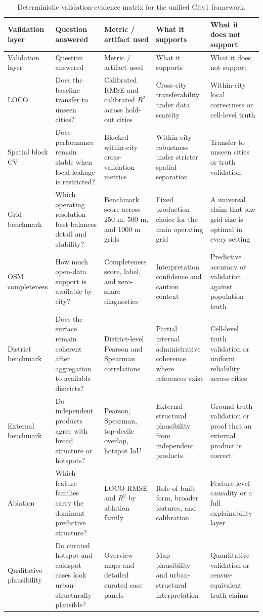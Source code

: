\begingroup
\small
\setlength{\LTleft}{0pt}
\setlength{\LTright}{0pt}
\begin{longtable}{L{0.14\textwidth} L{0.18\textwidth} L{0.16\textwidth} L{0.20\textwidth} L{0.22\textwidth}}
\caption{Deterministic validation-evidence matrix for the unified City1 framework.}\label{tab:s1-deterministic-evidence}\\
\toprule
Validation layer & Question answered & Metric / artifact used & What it supports & What it does not support \\
\midrule
\endfirsthead
\toprule
Validation layer & Question answered & Metric / artifact used & What it supports & What it does not support \\
\midrule
\endhead
\bottomrule
\endfoot
LOCO & Does the baseline transfer to unseen cities? & Calibrated RMSE and calibrated $R^2$ across hold-out cities & Cross-city transferability under data scarcity & Within-city local correctness or cell-level truth \\
Spatial block CV & Does performance remain stable when local leakage is restricted? & Blocked within-city cross-validation metrics & Within-city robustness under stricter spatial separation & Transfer to unseen cities or truth validation \\
Grid benchmark & Which operating resolution best balances detail and stability? & Benchmark score across 250 m, 500 m, and 1000 m grids & Fixed production choice for the main operating grid & A universal claim that one grid size is optimal in every setting \\
OSM completeness & How much open-data support is available by city? & Completeness score, label, and zero-share diagnostics & Interpretation confidence and caution context & Predictive accuracy or validation against population truth \\
District benchmark & Does the surface remain coherent after aggregation to available districts? & District-level Pearson and Spearman correlations & Partial internal administrative coherence where references exist & Cell-level truth validation or uniform reliability across cities \\
External benchmark & Do independent products agree with broad structure or hotspots? & Pearson, Spearman, top-decile overlap, hotspot IoU & External structural plausibility from independent products & Ground-truth validation or proof that an external product is correct \\
Ablation & Which feature families carry the dominant predictive structure? & LOCO RMSE and $R^2$ by ablation family & Role of built form, broader features, and calibration & Feature-level causality or a full explainability layer \\
Qualitative plausibility & Do curated hotspot and coldspot cases look urban-structurally plausible? & Overview maps and detailed curated case panels & Map plausibility and urban-structural interpretation & Quantitative validation or census-equivalent truth claims \\
\end{longtable}
\endgroup

